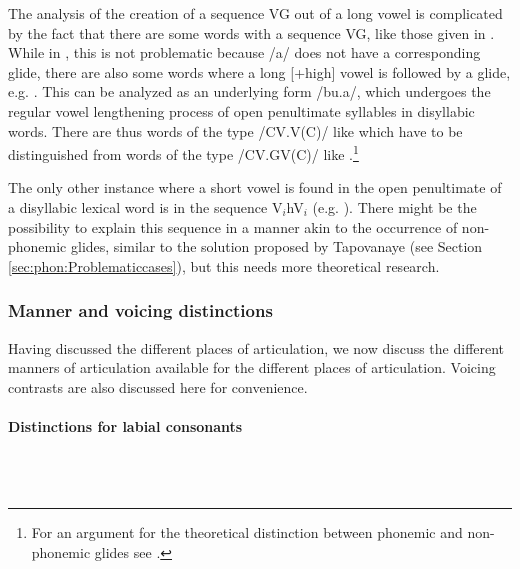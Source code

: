 The analysis of the creation of a sequence VG out of a long vowel is complicated by the fact that there are some words with a sequence V\textipa{:}G, like those given in . While in , this is not problematic because /a/ does not have a corresponding glide, there are also some words where a long [+high] vowel is followed by a glide, e.g. . This can be analyzed as an underlying form /bu.\V a/, which undergoes the regular vowel lengthening process of open penultimate syllables in disyllabic words. There are thus words of the type /CV.V(C)/ like  which have to be distinguished from words of the type /CV.GV(C)/ like .\footnote{For an  argument for the theoretical distinction between phonemic and non-phonemic glides see \citet{Levi2008glides}.}

The only other instance where a short vowel is found in the open penultimate of a disyllabic lexical word is in the sequence V$_i$hV$_i$ (e.g. ). There might be the possibility to explain this sequence in a manner akin to the occurrence of non-phonemic glides, similar to the solution proposed by Tapovanaye (see Section  \ref{sec:phon:Problematiccases}), but this needs more theoretical research.


 





\subsubsection{Manner and voicing distinctions}\label{sec:phon:Mannerandvoicingdistinctions}
Having discussed the different places of articulation, we now discuss the different manners of articulation available for the different places of articulation. Voicing contrasts are also discussed here for convenience.

\paragraph{Distinctions for labial consonants}
{~}\\

\\ 

